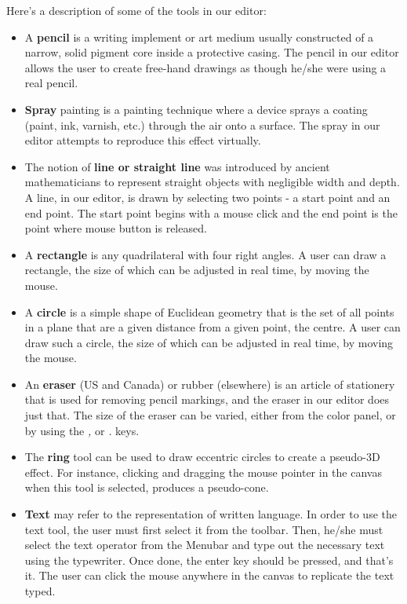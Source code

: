 \documentclass[12pt]{report}
\begin{document}
Here's a description of some of the tools in our editor:

\begin{itemize}
\item{A \textbf{pencil }is a writing implement or art medium usually constructed of a narrow, solid pigment core inside a protective casing. The pencil in our editor allows the user to create free-hand drawings as though he/she were using a real pencil.}
\item{\textbf{Spray }painting is a painting technique where a device sprays a coating (paint, ink, varnish, etc.) through the air onto a surface. The spray in our editor attempts to reproduce this effect virtually.}
\item{The notion of \textbf{line or straight line }was introduced by ancient mathematicians to represent straight objects with negligible width and depth. A line, in our editor, is drawn by selecting two points - a start point and an end point. The start point begins with a mouse click and the end point is the point where mouse button is released.} 
\item{A \textbf{rectangle }is any quadrilateral with four right angles. A user can draw a rectangle, the size of which can be adjusted in real time, by moving the mouse.}
\item{A \textbf{circle }is a simple shape of Euclidean geometry that is the set of all points in a plane that are a given distance from a given point, the centre. A user can draw such a circle, the size of which can be adjusted in real time, by moving the mouse.}
\item{An \textbf{eraser }(US and Canada) or rubber (elsewhere) is an article of stationery that is used for removing pencil markings, and the eraser in our editor does just that. The size of the eraser can be varied, either from the color panel, or by using the \textit{,} or \textit{.} keys.}
\item{The \textbf{ring }tool can be used to draw eccentric circles to create a pseudo-3D effect. For instance, clicking and dragging the mouse pointer in the canvas when this tool is selected, produces a pseudo-cone.}
\item{\textbf{Text} may refer to the representation of written language. In order to use the text tool, the user must first select it from the toolbar. Then, he/she must select the text operator from the Menubar and type out the necessary text using the typewriter. Once done, the enter key should be pressed, and that's it. The user can click the mouse anywhere in the canvas to replicate the text typed. }

\end{itemize}
\end{document}
